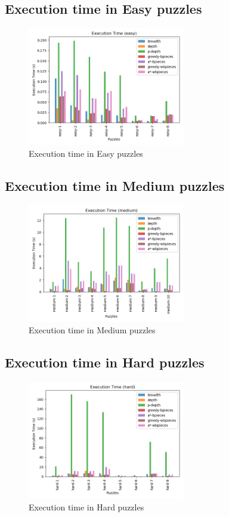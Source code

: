 \documentclass[conference]{IEEEtran}
\begin{document}
\subsection{Execution time in Easy puzzles}
\begin{figure}[H]
    \centerline{\includegraphics[width=260px]{../../graphics/executionTime-easy.png}}
    \caption{Execution time in Easy puzzles}
\end{figure}

\subsection{Execution time in Medium puzzles}
\begin{figure}[H]
    \centerline{\includegraphics[width=260px]{../../graphics/executionTime-medium.png}}
    \caption{Execution time in Medium puzzles}
\end{figure}

\subsection{Execution time in Hard puzzles}
\begin{figure}[H]
    \centerline{\includegraphics[width=260px]{../../graphics/executionTime-hard.png}}
    \caption{Execution time in Hard puzzles}
\end{figure}
\end{document}
